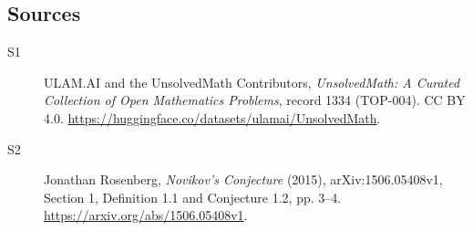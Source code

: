 \documentclass[11pt]{article}
\begin{document}
\subsection{Sources}
\begin{description}
\item[\hypertarget{source:1334:1}{S1}] ULAM.AI and the UnsolvedMath Contributors, \emph{UnsolvedMath: A Curated Collection of Open Mathematics Problems}, record 1334 (TOP-004). CC BY 4.0. \url{https://huggingface.co/datasets/ulamai/UnsolvedMath}.
\item[\hypertarget{source:1334:2}{S2}] Jonathan Rosenberg, \emph{Novikov's Conjecture} (2015), arXiv:1506.05408v1, Section 1, Definition 1.1 and Conjecture 1.2, pp. 3--4. \url{https://arxiv.org/abs/1506.05408v1}.
\end{description}
\label{end:1334}
\end{document}
